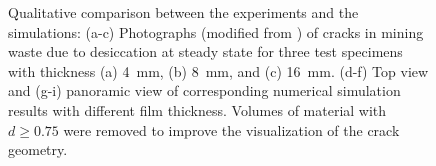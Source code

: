 \begin{figure}[!htb]
\begin{subfigure}{0.23\textwidth}
    \caption{}
  \end{subfigure}
  \caption{Qualitative comparison between the experiments and the simulations: (a-c) Photographs (modified from \cite{Rodriguez2006}) of  cracks in mining waste due to desiccation at steady state for three test specimens with thickness (a) \SI{4}{\milli\meter}, (b) \SI{8}{\milli\meter}, and (c) \SI{16}{\milli\meter}.  (d-f) Top view and (g-i) panoramic view of corresponding numerical simulation results with different film thickness.  Volumes of material with $d \geqslant 0.75$ were removed to improve the visualization of the crack geometry. }
  \label{fig: Chapter4/3D/3D}
\end{figure}

